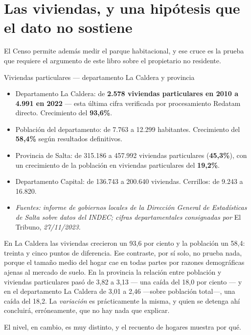 \section{Las viviendas, y una hipótesis que el dato no sostiene}

El Censo permite además medir el parque habitacional, y ese cruce es la prueba que requiere el argumento de este libro sobre el propietario no residente.

\begin{ficha}{Viviendas particulares --- departamento La Caldera y provincia}
\begin{itemize}[leftmargin=*,nosep]
\item Departamento La Caldera: de \textbf{2.578 viviendas particulares en 2010 a 4.991 en 2022} --- esta última cifra verificada por procesamiento Redatam directo. Crecimiento del \textbf{93,6\%}.
\item Población del departamento: de 7.763 a 12.299 habitantes. Crecimiento del \textbf{58,4\%} según resultados definitivos.
\item Provincia de Salta: de 315.186 a 457.992 viviendas particulares (\textbf{45,3\%}), con un crecimiento de la población en viviendas particulares del \textbf{19,2\%}.
\item Departamento Capital: de 136.743 a 200.640 viviendas. Cerrillos: de 9.243 a 16.820.
\item \textit{Fuentes: informe de gobiernos locales de la Dirección General de Estadísticas de Salta sobre datos del INDEC; cifras departamentales consignadas por} El Tribuno, \textit{27/11/2023.}
\end{itemize}
\end{ficha}

En La Caldera las viviendas crecieron un 93,6 por ciento y la población un 58,4: treinta y cinco puntos de diferencia. Ese contraste, por sí solo, no prueba nada, porque el tamaño medio del hogar cae en todas partes por razones demográficas ajenas al mercado de suelo. En la provincia la relación entre población y viviendas particulares pasó de 3,82 a 3,13 --- una caída del 18,0 por ciento --- y en el departamento La Caldera de 3,01 a 2,46 ---sobre población total---, una caída del 18,2. La \textit{variación} es prácticamente la misma, y quien se detenga ahí concluirá, erróneamente, que no hay nada que explicar.

El nivel, en cambio, es muy distinto, y el recuento de hogares muestra por qué.

